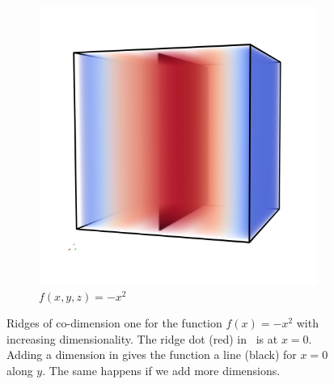 \begin{figure}[t]
\begin{subfigure}[b]{0.33\textwidth}
    \label{fig:ridge2D}
  \end{subfigure}
  \begin{subfigure}[b]{0.33\textwidth}
    \includegraphics[width=\textwidth]{Images/func3D.png}
    \caption{$f(x,y,z)= -x^2$}
    \label{fig:ridge3D}
  \end{subfigure}
  \caption{Ridges of co-dimension one for the function $f(x)=-x^2$ with
  increasing dimensionality. The ridge dot (red) in~
  is at $x=0$. Adding a dimension in  gives the
  function a line (black) for $x=0$ along $y$. The same happens if we add
  more dimensions.}
\end{figure}

